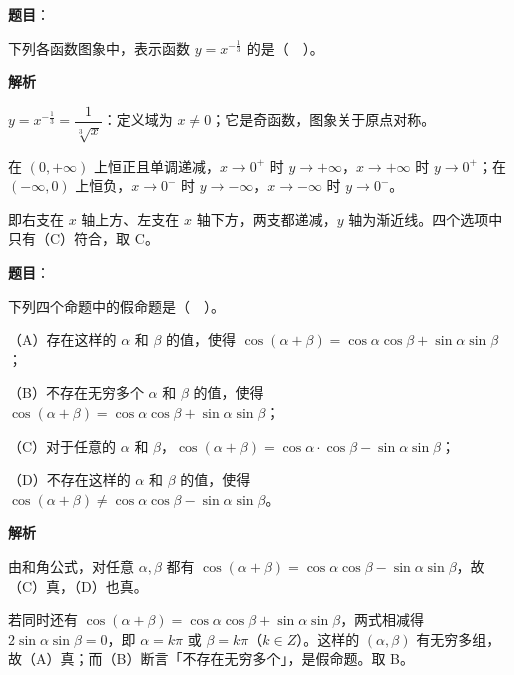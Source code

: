 \begin{answer}

\textbf{题目}：

下列各函数图象中，表示函数 $y=x^{-\frac{1}{3}}$ 的是（　）。
\nopagebreak[4]
\begin{center}\end{center}
\nopagebreak[4]
\textbf{解析}

$y=x^{-\frac{1}{3}}=\dfrac{1}{\sqrt[3]{x}}$：定义域为 $x\ne 0$；它是奇函数，图象关于原点对称。

在 $(0,+\infty)$ 上恒正且单调递减，$x\to 0^{+}$ 时 $y\to+\infty$，$x\to+\infty$ 时 $y\to 0^{+}$；在 $(-\infty,0)$ 上恒负，$x\to 0^{-}$ 时 $y\to-\infty$，$x\to-\infty$ 时 $y\to 0^{-}$。

即右支在 $x$ 轴上方、左支在 $x$ 轴下方，两支都递减，$y$ 轴为渐近线。四个选项中只有（C）符合，取 C。


\end{answer}
\begin{answer}

\textbf{题目}：

下列四个命题中的假命题是（　）。

（A）存在这样的 $\alpha$ 和 $\beta$ 的值，使得 $\cos(\alpha+\beta)=\cos\alpha\cos\beta+\sin\alpha\sin\beta$；

（B）不存在无穷多个 $\alpha$ 和 $\beta$ 的值，使得 $\cos(\alpha+\beta)=\cos\alpha\cos\beta+\sin\alpha\sin\beta$；

（C）对于任意的 $\alpha$ 和 $\beta$，$\cos(\alpha+\beta)=\cos\alpha\cdot\cos\beta-\sin\alpha\sin\beta$；

（D）不存在这样的 $\alpha$ 和 $\beta$ 的值，使得 $\cos(\alpha+\beta)\ne\cos\alpha\cos\beta-\sin\alpha\sin\beta$。

\textbf{解析}

由和角公式，对任意 $\alpha,\beta$ 都有 $\cos(\alpha+\beta)=\cos\alpha\cos\beta-\sin\alpha\sin\beta$，故（C）真，（D）也真。

若同时还有 $\cos(\alpha+\beta)=\cos\alpha\cos\beta+\sin\alpha\sin\beta$，两式相减得 $2\sin\alpha\sin\beta=0$，即 $\alpha=k\pi$ 或 $\beta=k\pi$（$k\in Z$）。这样的 $(\alpha,\beta)$ 有无穷多组，故（A）真；而（B）断言「不存在无穷多个」，是假命题。取 B。


\end{answer}
